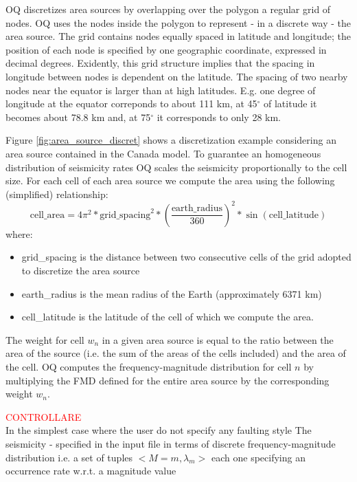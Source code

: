 OQ discretizes area sources by overlapping over the polygon a regular grid of nodes. OQ uses the nodes inside the polygon to represent - in a discrete way - the area source.
The grid contains nodes equally spaced in latitude and longitude; the position of each node is specified by one geographic coordinate, expressed in decimal degrees. 
%
Exidently, this grid structure implies that the spacing in longitude between nodes is dependent on the latitude. The spacing of two nearby nodes near the equator is larger than at high latitudes. E.g. one degree of longitude at the equator correponds to about 111 km, at 45$^\circ$ of latitude it becomes about 78.8 km and, at 75$^\circ$ it corresponds to only 28 km. 
 
Figure \ref{fig:area_source_discret} shows a discretization example considering an area source contained in the Canada model. 
%
To guarantee an homogeneous distribution of seismicity rates OQ scales the seismicity proportionally to the cell size. For each cell of each area source we compute the area using the following (simplified) relationship:
\begin{equation}
 \text{cell\_area} = 4\pi^2 * \text{grid\_spacing}^2 *  
 	\left(\frac{\text{earth\_radius}}{360}\right)^2 * 
 	\sin(\text{cell\_latitude})
\end{equation}
where:
\begin{itemize}
\item grid\_spacing is the distance between two consecutive cells of the grid  
	adopted to discretize the area source 
\item earth\_radius is the mean radius of the Earth (approximately 6371 km) 
\item cell\_latitude is the latitude of the cell of which we compute the area.
\end{itemize}
%
The weight for cell $w_n$ in a given area source is equal to the ratio between the area of the source (i.e. the sum of the areas of the cells included) and the 
area of the cell.
% 
OQ computes the frequency-magnitude distribution for cell $n$ by multiplying the 
FMD defined for the entire area source by the corresponding weight $w_n$. 

\textcolor{red}{CONTROLLARE}\dotfill \\
In the simplest case where the user do not specify any faulting style The seismicity - specified in the input file in terms of discrete frequency-magnitude distribution i.e. a set of tuples $<M=m,\lambda_m>$ each one specifying an occurrence rate w.r.t. a magnitude value 

